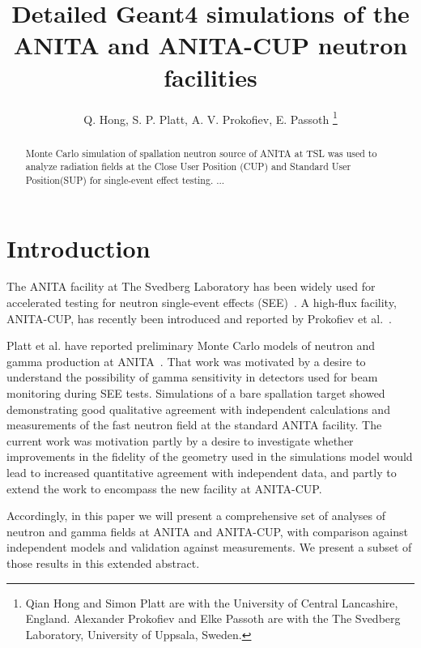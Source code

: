 \documentclass[11pt,a4paper]{IEEEtran}
\begin{document}
\title{
    Detailed Geant4 simulations of the ANITA and ANITA-CUP neutron facilities
}

\author{%
    Q. Hong,
    S. P. Platt,
    A. V. Prokofiev,
    E. Passoth
    \thanks{%
        Qian Hong and Simon Platt are with the University of Central Lancashire, England. Alexander Prokofiev and Elke Passoth are with the The Svedberg Laboratory, University of Uppsala, Sweden.
    }
}

\maketitle

\begin{abstract}
    Monte Carlo simulation of spallation neutron source of ANITA at TSL was used to analyze radiation fields at the Close User Position (CUP) and Standard User Position(SUP) for single-event effect testing. ...
\end{abstract}

\section{Introduction}

The ANITA facility at The Svedberg Laboratory has been widely used for accelerated testing for neutron single-event effects (SEE)~\cite{Prokofiev2009}.
A high-flux facility, ANITA-CUP, has recently been introduced and reported by Prokofiev et al.~\cite{Prokofiev2014}.

Platt et al. have reported preliminary Monte Carlo models of neutron and gamma production at ANITA~\cite{Platt2013}.
That work was motivated by a desire to understand the possibility of gamma sensitivity in detectors used for beam monitoring during SEE tests.
Simulations of a bare spallation target showed demonstrating good qualitative agreement with independent calculations and measurements of the fast neutron field at the standard ANITA facility.
The current work was motivation partly by a desire to investigate whether improvements in the fidelity of the geometry used in the simulations model would lead to increased quantitative agreement with independent data, and partly to extend the work to encompass the new facility at ANITA-CUP.

Accordingly, in this paper we will present a comprehensive set of analyses of neutron and gamma fields at ANITA and ANITA-CUP, with comparison against independent models and validation against measurements.
We present a subset of those results in this extended abstract.
\end{document}
